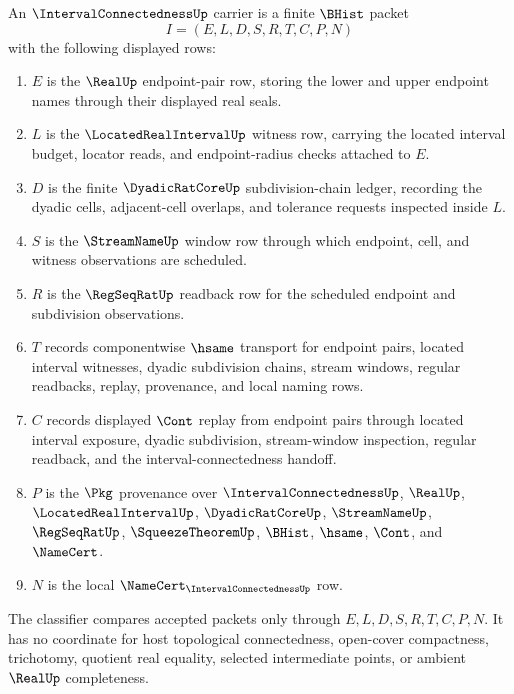 \begin{definition}
\label{def:interval-connectedness-carrier}
An $\IntervalConnectednessUp$ carrier is a finite $\BHist$ packet
$$
I=(E,L,D,S,R,T,C,P,N)
$$
with the following displayed rows:
\begin{enumerate}
\item $E$ is the $\RealUp$ endpoint-pair row, storing the lower and upper endpoint names through their displayed real seals.
\item $L$ is the $\LocatedRealIntervalUp$ witness row, carrying the located interval budget, locator reads, and endpoint-radius checks attached to $E$.
\item $D$ is the finite $\DyadicRatCoreUp$ subdivision-chain ledger, recording the dyadic cells, adjacent-cell overlaps, and tolerance requests inspected inside $L$.
\item $S$ is the $\StreamNameUp$ window row through which endpoint, cell, and witness observations are scheduled.
\item $R$ is the $\RegSeqRatUp$ readback row for the scheduled endpoint and subdivision observations.
\item $T$ records componentwise $\hsame$ transport for endpoint pairs, located interval witnesses, dyadic subdivision chains, stream windows, regular readbacks, replay, provenance, and local naming rows.
\item $C$ records displayed $\Cont$ replay from endpoint pairs through located interval exposure, dyadic subdivision, stream-window inspection, regular readback, and the interval-connectedness handoff.
\item $P$ is the $\Pkg$ provenance over $\IntervalConnectednessUp$, $\RealUp$, $\LocatedRealIntervalUp$, $\DyadicRatCoreUp$, $\StreamNameUp$, $\RegSeqRatUp$, $\SqueezeTheoremUp$, $\BHist$, $\hsame$, $\Cont$, and $\NameCert$.
\item $N$ is the local $\NameCert_{\IntervalConnectednessUp}$ row.
\end{enumerate}
The classifier compares accepted packets only through $E,L,D,S,R,T,C,P,N$. It has no coordinate for host topological connectedness, open-cover compactness, trichotomy, quotient real equality, selected intermediate points, or ambient $\RealUp$ completeness.
\end{definition}

